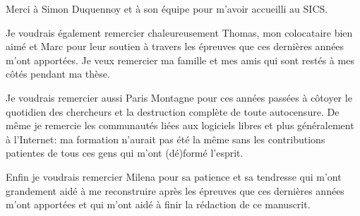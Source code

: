 \bigskip

Merci à Simon Duquennoy et à son équipe pour m'avoir accueilli au SICS.

\bigskip

Je voudrais également remercier chaleureusement Thomas, mon colocataire bien aimé et Marc pour leur soutien à travers les épreuves que ces dernières années m'ont apportées.
Je veux remercier ma famille et mes amis qui sont restés à mes côtés pendant ma thèse.

\bigskip

Je voudrais remercier aussi Paris Montagne pour ces années passées à côtoyer le quotidien des chercheurs et la destruction complète de toute autocensure.
De même je remercie les communautés liées aux logiciels libres et plus généralement à l'Internet: ma formation n'aurait pas été la même sans les contributions patientes de tous ces gens qui m'ont (dé)formé l'esprit.

Enfin je voudrais remercier Milena pour sa patience et sa tendresse qui m'ont grandement aidé à me reconstruire après les épreuves que ces dernières années m'ont apportées et qui m'ont aidé à finir la rédaction de ce manuscrit.

\endgroup
